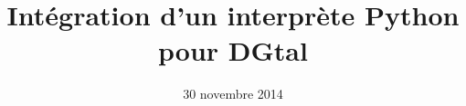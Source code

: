 \documentclass[11pt, french, screen]{report-rd-info}
\begin{document}
\title{Intégration d'un interprète Python pour DGtal}
\date{30 novembre 2014}

\end{document}
